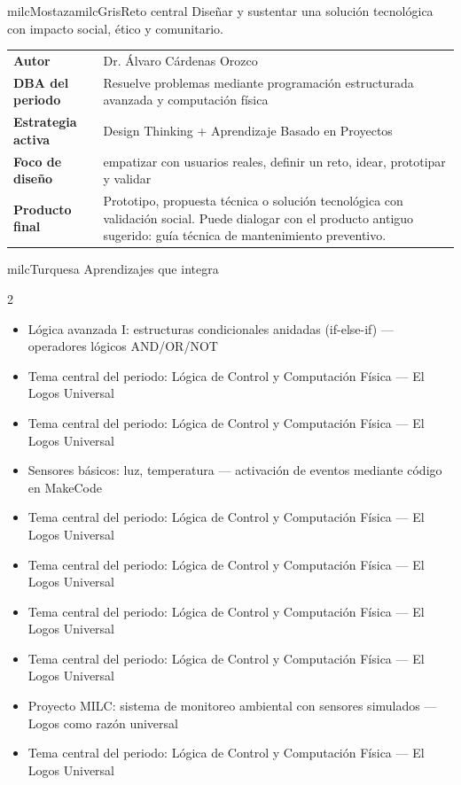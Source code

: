 \documentclass[11pt,letterpaper]{article}
\begin{document}
\begin{softbox}{milcMostaza}{milcGris}{Reto central}
Diseñar y sustentar una solución tecnológica con impacto social, ético y comunitario.
\end{softbox}

\begin{tabularx}{\textwidth}{>{\bfseries}p{3.4cm}X}
\rowcolor{milcMagenta!12}Autor & Dr. Álvaro Cárdenas Orozco\\
DBA del periodo & Resuelve problemas mediante programación estructurada avanzada y computación física\\
Estrategia activa & Design Thinking + Aprendizaje Basado en Proyectos\\
Foco de diseño & empatizar con usuarios reales, definir un reto, idear, prototipar y validar\\
Producto final & Prototipo, propuesta técnica o solución tecnológica con validación social. Puede dialogar con el producto antiguo sugerido: guía técnica de mantenimiento preventivo.\\
\end{tabularx}

\begin{titlebox}{milcTurquesa}
Aprendizajes que integra
\end{titlebox}
\begin{multicols}{2}
\begin{itemize}[leftmargin=*]
\item Lógica avanzada I: estructuras condicionales anidadas (if-else-if) — operadores lógicos AND/OR/NOT
\item Tema central del periodo: Lógica de Control y Computación Física — El Logos Universal
\item Tema central del periodo: Lógica de Control y Computación Física — El Logos Universal
\item Sensores básicos: luz, temperatura — activación de eventos mediante código en MakeCode
\item Tema central del periodo: Lógica de Control y Computación Física — El Logos Universal
\item Tema central del periodo: Lógica de Control y Computación Física — El Logos Universal
\item Tema central del periodo: Lógica de Control y Computación Física — El Logos Universal
\item Tema central del periodo: Lógica de Control y Computación Física — El Logos Universal
\item Proyecto MILC: sistema de monitoreo ambiental con sensores simulados — Logos como razón universal
\item Tema central del periodo: Lógica de Control y Computación Física — El Logos Universal
\end{itemize}
\end{multicols}
\end{document}
